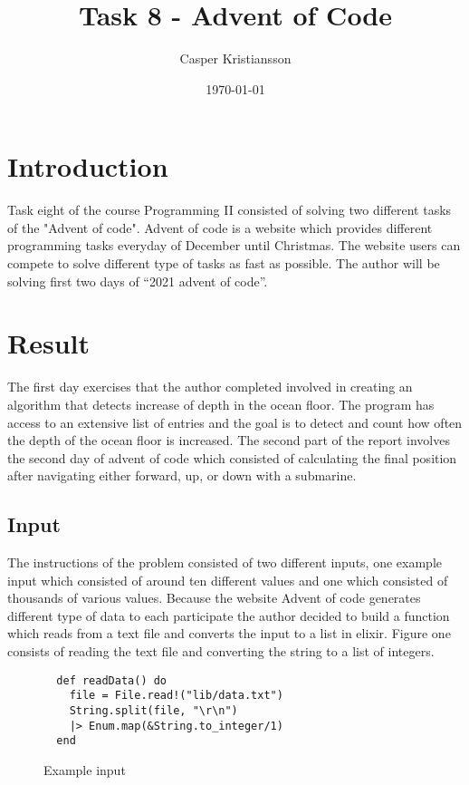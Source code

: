 \documentclass[a4paper,11pt]{article}
\begin{document}
\title{
    \textbf{Task 8 - Advent of Code}
}
\author{Casper Kristiansson}
\date{\today}

\maketitle

\section*{Introduction}
Task eight of the course Programming II consisted of solving two different tasks of the "Advent of code". Advent of code is a website which provides different programming tasks everyday of December until Christmas. The website users can compete to solve different type of tasks as fast as possible. The author will be solving first two days of “2021 advent of code”.

\section*{Result}
The first day exercises that the author completed involved in creating an algorithm that detects increase of depth in the ocean floor. The program has access to an extensive list of entries and the goal is to detect and count how often the depth of the ocean floor is increased. The second part of the report involves the second day of advent of code which consisted of calculating the final position after navigating either forward, up, or down with a submarine.

\subsection*{Input}
The instructions of the problem consisted of two different inputs, one example input which consisted of around ten different values and one which consisted of thousands of various values. Because the website Advent of code generates different type of data to each participate the author decided to build a function which reads from a text file and converts the input to a list in elixir. Figure one consists of reading the text file and converting the string to a list of integers.

\begin{figure}[H]
\begin{verbatim}
  def readData() do
    file = File.read!("lib/data.txt")
    String.split(file, "\r\n")
    |> Enum.map(&String.to_integer/1)
  end
\end{verbatim}
\caption{Example input}
\label{Figure:1}
\end{figure}
\end{document}
